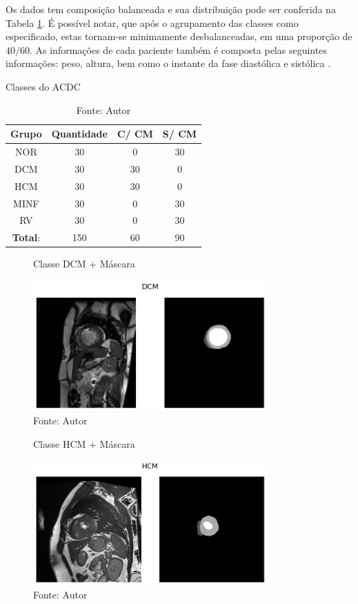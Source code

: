 Os dados tem composição balanceada e sua distribuição pode ser conferida na Tabela \ref{tab:count_dataset}. É possível notar, que após o agrupamento das classes como especificado, estas tornam-se minimamente desbalanceadas, em uma proporção de $40/60$. As informações de cada paciente também é composta pelas seguintes informações: peso, altura, bem como o instante da fase diastólica e sistólica \cite{bernardDeepLearningTechniques2018a}.

\begin{table}[H]
    \centering
    \caption{Classes do ACDC}
    \renewcommand{\arraystretch}{1} %
    \begin{tabular}{|c|c|c|c|}
    \hline 
          \textbf{Grupo} & \textbf{Quantidade} & \textbf{C/ CM} & \textbf{S/ CM}  \\ 
    \hline 
        NOR & 30 & 0 & 30 \\ 
        DCM & 30 & 30 & 0\\ 
        HCM & 30 & 30 & 0\\ 
        MINF & 30 & 0 & 30 \\ 
        RV & 30 & 0 & 30 \\
    \hline 
        \textbf{Total}: & 150  & 60 & 90\\ 
    \hline 
    \end{tabular} 
    \caption*{Fonte: Autor}
    \label{tab:count_dataset}
\end{table}


\begin{figure}[H]
    \centering
    \caption{Classe DCM + Máscara}
    \includegraphics[width=0.8\textwidth]{figures/fig033-01.png}
    \caption*{Fonte: Autor}
    \label{fig:fig033-01}
\end{figure}

\begin{figure}[H]
    \centering
    \caption{Classe HCM + Máscara}
    \includegraphics[width=0.8\textwidth]{figures/fig033-02.png}
    \caption*{Fonte: Autor}
    \label{fig:fig033-02}
\end{figure}

